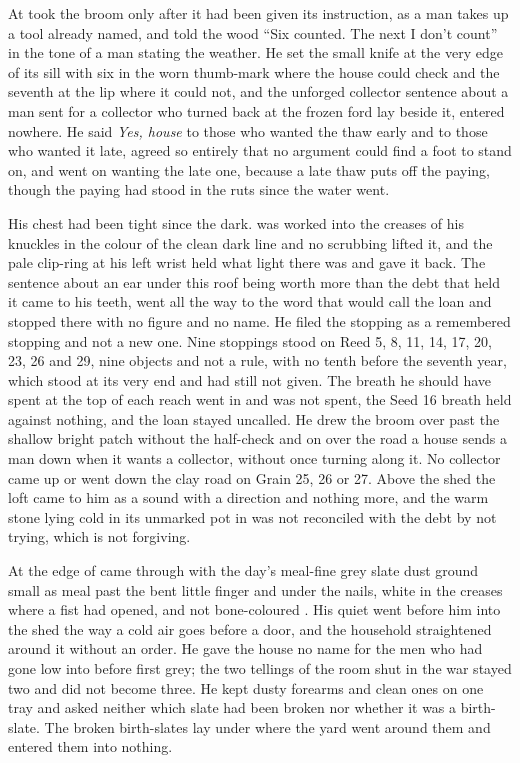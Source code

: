 \scenebreak

At   took the broom only after it had been given its instruction, as a man takes up a tool already named, and told the wood “Six counted. The next I don't count” in the tone of a man stating the weather. He set the small knife at the very edge of its sill with six in the worn thumb-mark where the house could check and the seventh at the lip where it could not, and the unforged collector sentence about a man sent for a collector who turned back at the frozen ford lay beside it, entered nowhere. He said \emph{Yes, house} to those who wanted the thaw early and to those who wanted it late, agreed so entirely that no argument could find a foot to stand on, and went on wanting the late one, because a late thaw puts off the paying, though the paying had stood in the ruts since the water went.

His chest had been tight since the dark.  was worked into the creases of his knuckles in the colour of the clean dark line and no scrubbing lifted it, and the pale clip-ring at his left wrist held what light there was and gave it back. The sentence about an ear under this roof being worth more than the debt that held it came to his teeth, went all the way to the word that would call the loan and stopped there with no figure and no name. He filed the stopping as a remembered stopping and not a new one. Nine stoppings stood on Reed 5, 8, 11, 14, 17, 20, 23, 26 and 29, nine objects and not a rule, with no tenth before the seventh year, which stood at its very end and had still not given. The breath he should have spent at the top of each reach went in and was not spent, the Seed 16 breath held against nothing, and the loan stayed uncalled. He drew the broom over  past the shallow bright patch without the half-check and on over the road a house sends a man down when it wants a collector, without once turning along it. No collector came up or went down the clay road on Grain 25, 26 or 27. Above the shed the loft came to him as a sound with a direction and nothing more, and the warm stone lying cold in its unmarked pot in  was not reconciled with the debt by not trying, which is not forgiving.

At the edge of   came through with the day's meal-fine grey slate dust ground small as meal past the bent little finger and under the nails, white in the creases where a fist had opened, and not bone-coloured . His quiet went before him into the shed the way a cold air goes before a door, and the household straightened around it without an order. He gave the house no name for the men who had gone low into  before first grey; the two tellings of the room shut in the war stayed two and did not become three. He kept dusty forearms and clean ones on one tray and asked neither which slate had been broken nor whether it was a birth-slate. The broken birth-slates lay under  where the yard went around them and entered them into nothing.

